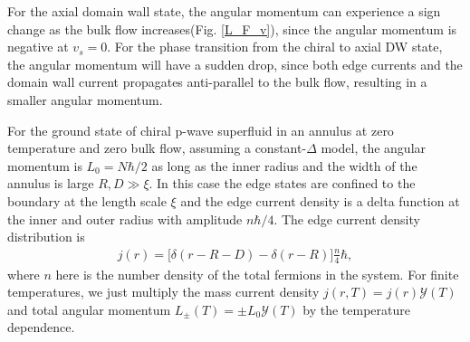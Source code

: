 \documentclass[aps,prb,reprint,groupedaddress]{revtex4-2}
\begin{document}
For the axial domain wall state, the angular momentum can experience a sign change as
the bulk flow increases(Fig. \ref{L_F_v}), since the angular momentum is negative
at $v_s=0$. For the phase transition from the chiral to axial DW state, the angular
momentum will have a sudden drop, since both edge currents and the domain wall current
propagates anti-parallel to the bulk flow, resulting in a smaller angular momentum.

For the ground state of chiral p-wave superfluid in an annulus at zero temperature and zero bulk flow,
assuming a constant-$\Delta$ model, the angular momentum is $L_0=N\hbar/2$ as long as
the inner radius and the width of the
annulus is large $R, D\gg\xi$. In this case the edge states are confined to the
boundary at the length scale $\xi$ and the edge current density is a delta function at
the inner and outer radius with amplitude $n\hbar/4$. The edge current density distribution
is
\begin{align}
    j(r) = \bigg[\delta(r-R-D) - \delta(r-R)\bigg] \frac{n}{4}\hbar,
\end{align}
where $n$ here is
the number density of the total fermions in the system\cite{Sauls11}. For finite temperatures,
we just multiply the mass current density $j(r,T) = j(r) \mathcal{Y}(T)$ and total angular
momentum $L_\pm(T) = \pm L_0\mathcal{Y}(T)$ by the temperature dependence.
\end{document}

